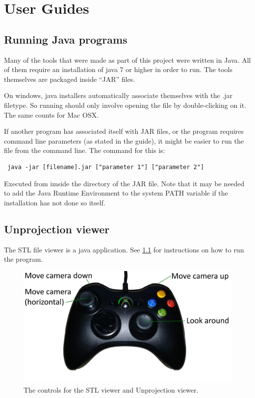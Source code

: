 \chapter{User Guides}


\section{Running Java programs}
\label{sec:run_java}
Many of the tools that were made as part of this project were written in Java. All of them require an installation of java 7 or higher in order to run. The tools themselves are packaged inside ``JAR'' files. 

On windows, java installers automatically associate themselves with the .jar filetype. So running should only involve opening the file by double-clicking on it. The same counts for Mac OSX.

If another program has associated itself with JAR files, or the program requires command line parameters (as stated in the guide), it might be easier to run the file from the command line. The command for this is:

\begin{verbatim} java -jar [filename].jar ["parameter 1"] ["parameter 2"] \end{verbatim}

Executed from imside the directory of the JAR file. Note that it may be needed to add the Java Runtime Environment to the system PATH variable if the installation has not done so itself.



\section{Unprojection viewer}
The STL file viewer is a java application. See \ref{sec:run_java} for instructions on how to run the program.

\begin{figure}
	\centering
	\includegraphics[width=120mm]{images/userGuide/controller_.png}
	\caption{The controls for the STL viewer and Unprojection viewer.}
	\label{fig:guide_controller}
\end{figure}

